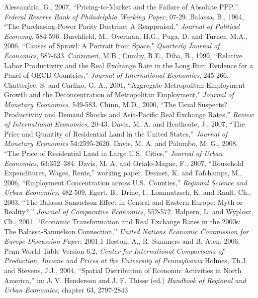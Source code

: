 \documentclass[12pt]{article}
\begin{document}
\begin{thebibliography}{99}
 Alessandria, G., 2007, ``Pricing-to-Market and the Failure of Absolute PPP,'' \emph{Federal Reserve Bank of Philadelphia Working Paper}, 07-29.
 Balassa, B., 1964, ``The Purchasing-Power Parity Doctrine: A Reappraisal,'' \emph{Journal of Political Economy}, 584-596.
 Burchfield, M., Overman, H.G., Puga, D. and Turner, M.A., 2006, ``Causes of Sprawl: A Portrait from Space," \emph{Quarterly Journal of Economics}, 587-633.
 Canzoneri, M.B., Cumby, R.E., Diba, B., 1999, ``Relative Labor Productivity and the Real Exchange Rate in the Long Run: Evidence for a Panel of OECD Countries,'' \emph{Journal of International Economics}, 245-266.
 Chatterjee, S. and Carlino, G. A., 2001, ``Aggregate Metropolitan Employment Growth and the Deconcentration of Metropolitan Employment," \emph{Journal of Monetary Economics}, 549-583.
 Chinn, M.D., 2000, ``The Usual Suspects? Productivity and Demand Shocks and Asia-Pacific Real Exchange Rates,'' \emph{Review of International Economics}, 20-43.
 Davis, M. A. and Heathcote, J., 2007, ``The Price and Quantity of Residential Land in the United States,'' \emph{Journal of Monetary Economics} 54:2595-2620.
 Davis, M. A. and Palumbo, M. G., 2008, ``The Price
of Residential Land in Large U.S.~Cities,'' \emph{Journal of Urban Economics}, 63:352--384.
\bibitem{} Davis, M. A. and Ortalo-Magne, F., 2007, ``Household Expenditures, Wages, Rents,'' working paper.
 Desmet, K. and Fafchamps, M., 2006, ``Employment Concentration across U.S.~Counties,'' \emph{Regional Science and Urban Economics}, 482-509.
 Egert, B., Drine, I., Lommatzsch, K. and Rault, Ch., 2003, ``The Balassa-Samuelson Effect in Central and Eastern Europe: Myth or Reality?,'' \emph{Journal of Comparative Economics}, 552-572.
\bibitem{} Halpern, L. and Wyplosz, Ch., 2001, ``Economic Transformation and Real Exchange Rates in the 2000s: The Balassa-Samuelson Connection,'' \emph{United Nations Economic Commission for Europe Discussion Paper}, 2001.1
 Heston, A., R. Summers and B. Aten, 2006, Penn World Table Version 6.2, \emph{Center for International Comparisons of Production, Income and Prices at the University of
Pennsylvania}
 Holmes, Th.J. and Stevens, J.J., 2004, ``Spatial Distribution of Economic Activities in North America,'' in: J. V. Henderson and J. F. Thisse (ed.) \emph{Handbook of Regional and Urban Economics}, chapter 63, 2797-2843

\end{thebibliography}
\end{document}
